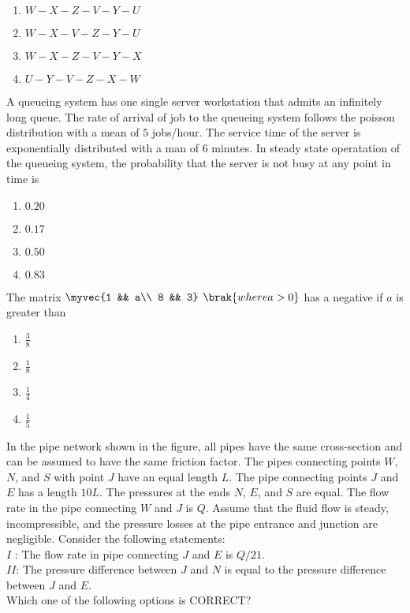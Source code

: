 \begin{enumerate}
    \item$W-X-Z-V-Y-U$\\
    \item$W-X-V-Z-Y-U$\\
    \item$W-X-Z-V-Y-X$\\
    \item$U-Y-V-Z-X-W$\\
\end{enumerate}
\item A queueing system has one single server workstation that admits an infinitely long queue. The rate of arrival of job to the queueing system follows the poisson distribution with a mean of $5$ jobs/hour. The service time of the server is exponentially distributed with a man of $6$ minutes. In steady state operatation of the queueing system, the probability that the server is not busy at any point in time is\\
\begin{enumerate}
    \item$0.20$\\
    \item$0.17$\\
    \item$0.50$\\
    \item$0.83$\\
\end{enumerate}
\item The matrix $\myvec{1 && a\\ 8 && 3}$ $\brak{where a > 0}$ has a negative if $a$ is greater than\\
\begin{enumerate}
    \item$\frac{3}{8}$\\
     \item$\frac{1}{8}$\\
      \item$\frac{1}{4}$\\
       \item$\frac{1}{5}$\\
\end{enumerate}
\item In the pipe network shown in the figure, all pipes have the same cross-section and
can be assumed to have the same friction factor. The pipes connecting points $W$, $N$,
and $S$ with point $J$ have an equal length $L$. The pipe connecting points $J$ and $E$ has a
length $10L$. The pressures at the ends $N$, $E$, and $S$ are equal. The flow rate in the pipe
connecting $W$ and $J$ is $Q$. Assume that the fluid flow is steady, incompressible, and
the pressure losses at the pipe entrance and junction are negligible. Consider the
following statements:\\
$I$ : The flow rate in pipe connecting $J$ and $E$ is $Q/21$.\\
$II$: The pressure difference between $J$ and $N$ is equal to the pressure difference
between $J$ and $E$.\\
Which one of the following options is CORRECT?\\

